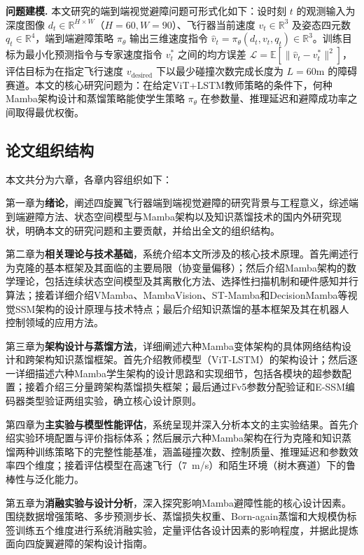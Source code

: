 \documentclass[12pt,a4paper]{article}
\numberwithin{equation}{section}
\numberwithin{figure}{section}
\numberwithin{table}{section}
\begin{document}
\textbf{问题建模.} 本文研究的端到端视觉避障问题可形式化如下：设时刻 $t$ 的观测输入为深度图像 $d_t \in \mathbb{R}^{H \times W}$（$H=60, W=90$）、飞行器当前速度 $v_t \in \mathbb{R}^3$ 及姿态四元数 $q_t \in \mathbb{R}^4$，端到端避障策略 $\pi_\theta$ 输出三维速度指令 $\hat{v}_t = \pi_\theta(d_t, v_t, q_t) \in \mathbb{R}^3$。训练目标为最小化预测指令与专家速度指令 $v_t^*$ 之间的均方误差 $\mathcal{L} = \mathbb{E}[\|\hat{v}_t - v_t^*\|^2]$，评估目标为在指定飞行速度 $v_{\text{desired}}$ 下以最少碰撞次数完成长度为 $L=60$m 的障碍赛道。本文的核心研究问题为：在给定ViT+LSTM教师策略的条件下，何种Mamba架构设计和蒸馏策略能使学生策略 $\pi_\theta$ 在参数量、推理延迟和避障成功率之间取得最优权衡。

\subsection{论文组织结构}

本文共分为六章，各章内容组织如下：

第一章为\textbf{绪论}，阐述四旋翼飞行器端到端视觉避障的研究背景与工程意义，综述端到端避障方法、状态空间模型与Mamba架构以及知识蒸馏技术的国内外研究现状，明确本文的研究问题和主要贡献，并给出全文的组织结构。

第二章为\textbf{相关理论与技术基础}，系统介绍本文所涉及的核心技术原理。首先阐述行为克隆的基本框架及其面临的主要局限（协变量偏移）；然后介绍Mamba架构的数学理论，包括连续状态空间模型及其离散化方法、选择性扫描机制和硬件感知并行算法；接着详细介绍VMamba、MambaVision、ST-Mamba和DecisionMamba等视觉SSM架构的设计原理与技术特点；最后介绍知识蒸馏的基本框架及其在机器人控制领域的应用方法。

第三章为\textbf{架构设计与蒸馏方法}，详细阐述六种Mamba变体架构的具体网络结构设计和跨架构知识蒸馏框架。首先介绍教师模型（ViT-LSTM）的架构设计；然后逐一详细描述六种Mamba学生架构的设计思路和实现细节，包括各模块的超参数配置；接着介绍三分量跨架构蒸馏损失框架；最后通过Fv5参数分配验证和E-SSM编码器类型验证两组实验，确立核心设计原则。

第四章为\textbf{主实验与模型性能评估}，系统呈现并深入分析本文的主实验结果。首先介绍实验环境配置与评价指标体系；然后展示六种Mamba架构在行为克隆和知识蒸馏两种训练策略下的完整性能基准，涵盖碰撞次数、控制质量、推理延迟和参数效率四个维度；接着评估模型在高速飞行（7~m/s）和陌生环境（树木赛道）下的鲁棒性与泛化能力。

第五章为\textbf{消融实验与设计分析}，深入探究影响Mamba避障性能的核心设计因素。围绕数据增强策略、多步预测步长、蒸馏损失权重、Born-again蒸馏和大规模伪标签训练五个维度进行系统消融实验，定量评估各设计因素的影响程度，并据此提炼面向四旋翼避障的架构设计指南。
\end{document}

